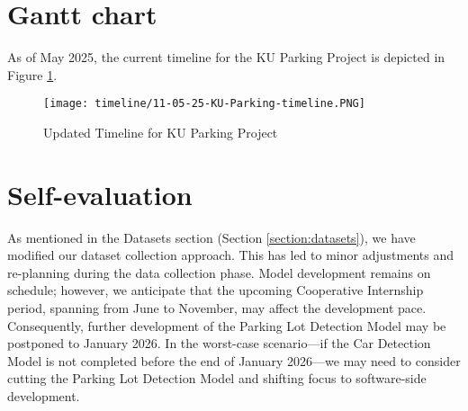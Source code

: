 \section{Gantt chart}
\label{section:gantt-chart}
As of May 2025, the current timeline for the KU Parking Project is depicted in Figure \ref{fig:11-05-25-timeline-dev-progress}.
\begin{figure}[H]
    \centering
    \texttt{[image: timeline/11-05-25-KU-Parking-timeline.PNG]}
    \caption{Updated Timeline for KU Parking Project}
    \label{fig:11-05-25-timeline-dev-progress}
\end{figure}

\section{Self-evaluation}
\label{section:self-evaluation}
As mentioned in the Datasets section (Section \ref{section:datasets}), we have modified our dataset collection approach. This has led to minor adjustments and re-planning during the data collection phase. Model development remains on schedule; however, we anticipate that the upcoming Cooperative Internship period, spanning from June to November, may affect the development pace. Consequently, further development of the Parking Lot Detection Model may be postponed to January 2026. In the worst-case scenario—if the Car Detection Model is not completed before the end of January 2026—we may need to consider cutting the Parking Lot Detection Model and shifting focus to software-side development.